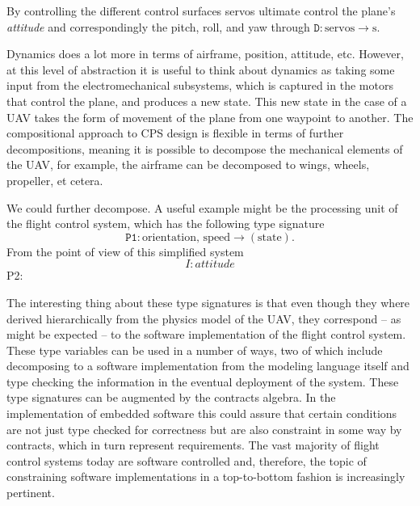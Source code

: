 \documentclass{article}
\begin{document}
By controlling the different control surfaces servos ultimate control the plane's \emph{attitude} and correspondingly the pitch, roll, and yaw through \(\mathtt{D}: \text{servos} \rightarrow \text{s.}\)

Dynamics does a lot more in terms of airframe, position, attitude, etc. However, at this level of abstraction it is useful to think about dynamics as taking some input from the electromechanical subsystems, which is captured in the motors that control the plane, and produces a new state.
This new state in the case of a UAV takes the form of movement of the plane from one waypoint to another.
The compositional approach to CPS design is flexible in terms of further decompositions, meaning it is possible to decompose the mechanical elements of the UAV, for example, the airframe can be decomposed to wings, wheels, propeller, et cetera.

We could further decompose. A useful example might be the processing unit of the flight control system, which has the following type signature
\[\mathtt{P1}: \text{orientation, speed} \rightarrow (\text{state}).\]
 From the point of view of this simplified system
\[I: attitude\]
P2:

The interesting thing about these type signatures is that even though they where derived hierarchically from the physics model of the UAV, they correspond -- as might be expected -- to the software implementation of the flight control system.
These type variables can be used in a number of ways, two of which include decomposing to a software implementation from the modeling language itself and type checking the information in the eventual deployment of the system.
These type signatures can be augmented by the contracts algebra.
In the implementation of embedded software this could assure
that certain conditions are not just type checked for correctness
but are also constraint in some way by contracts, which in turn represent requirements.
The vast majority of flight control systems today are software controlled and, therefore, the topic of constraining software implementations in a top-to-bottom fashion is increasingly pertinent.



\end{document}
